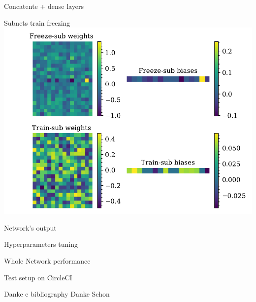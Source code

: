 \documentclass{beamer}
\begin{document}
\begin{frame}{Concatente + dense layers}

    
\end{frame}


\begin{frame}{Subnets train freezing}
    \includegraphics[width=.8\linewidth]{freezetraining.pdf}
\end{frame}

\begin{frame}{Network's output}

    
\end{frame}

\begin{frame}{Hyperparameters tuning}

    
\end{frame}


\begin{frame}{Whole Network performance}

    
\end{frame}

\begin{frame}{Test setup on CircleCI}

    
\end{frame}

\begin{frame}{Danke e bibliography}
\centering
Danke Schon

    
\end{frame}
\end{document}
